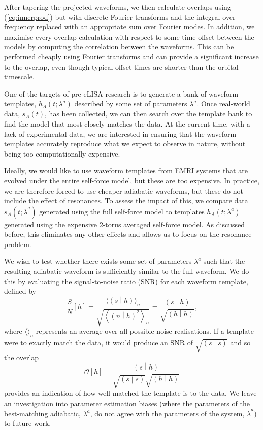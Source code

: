 \documentclass[aps,prd,amsfonts,amssymb,amsmath,nofootinbib,reprint,showpacs,superscriptaddress,twocolumn]{revtex4}
\newcommand{\eqnref}[1]{(\ref{eq:#1})}
\newcommand{\overlap}[2]{\ensuremath{\left(#1\middle|#2\right)}}
\begin{document}
After tapering the projected waveforms, we then calculate overlaps using \eqnref{innerprod} but with discrete Fourier transforms and the integral over frequency replaced with an appropriate sum over Fourier modes. In addition, we maximise every overlap calculation with respect to some time-offset between the models by computing the correlation between the waveforms. This can be performed cheaply using Fourier transforms and can provide a significant increase to the overlap, even though typical offset times are shorter than the orbital timescale.


One of the targets of pre-eLISA research is to generate a bank of waveform templates, $h_A(t;\lambda^a)$ described by some set of parameters $\lambda^a$. Once real-world data, $s_A(t)$, has been collected, we can then search over the template bank to find the model that most closely matches the data. At the current time, with a lack of experimental data, we are interested in ensuring that the waveform templates accurately reproduce what we expect to observe in nature, without being too computationally expensive.

Ideally, we would like to use waveform templates from EMRI systems that are evolved under the entire self-force model, but these are too expensive. In practice, we are therefore forced to use cheaper adiabatic waveforms, but these do not include the effect of resonances. To assess the impact of this, we compare data $s_A(t;\bar{\lambda}^a)$ generated using the full self-force model to templates $h_A(t;\lambda^a)$ generated using the expensive 2-torus averaged self-force model. As discussed before, this eliminates any other effects and allows us to focus on the resonance problem.

We wish to test whether there exists some set of parameters $\lambda^a$ such that the resulting adiabatic waveform is sufficiently similar to the full waveform. We do this by evaluating the signal-to-noise ratio (SNR) for each waveform template, defined by
\begin{equation}
\frac{S}{N}\left[h\right] = \frac{\langle\overlap{s}{h}\rangle_n}{\sqrt{\left\langle\overlap{n}{h}^2\right\rangle_n}} = \frac{\overlap{s}{h}}{\sqrt{\overlap{h}{h}}},
\end{equation}
where $\langle\rangle_n$ represents an average over all possible noise realisations. If a template were to exactly match the data, it would produce an SNR of $\sqrt{\overlap{s}{s}}$ and so the overlap
\begin{equation}
\label{eq:overlap}
\mathcal{O}\left[h\right] = \frac{\overlap{s}{h}}{\sqrt{\overlap{s}{s}}\sqrt{\overlap{h}{h}}}
\end{equation}
provides an indication of how well-matched the template is to the data. We leave an investigation into parameter estimation biases (where the parameters of the best-matching adiabatic, $\lambda^a$, do not agree with the parameters of the system, $\bar{\lambda}^a$) to future work.
\end{document}
